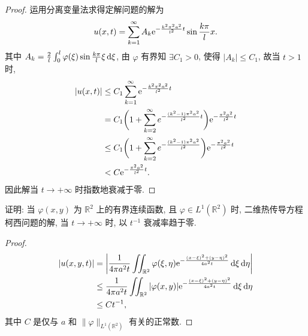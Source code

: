 \begin{proof}
  运用分离变量法求得定解问题的解为
  \[u(x,t) = \sum_{k=1}^{\infty} A_k \mathrm{e}^{-\frac{k^2\pi^2a^2}{l^2}t}\sin\frac{k\pi}{l}x.\]
  其中 $A_k=\frac{2}{l} \int_0^l \varphi(\xi) \sin\frac{k\pi}{l}\xi\mathop{}\!\mathrm{d}\xi$,
  由 $\varphi$ 有界知 $\exists C_1>0$, 使得 $|A_k|\leq C_1$, 故当 $t>1$ 时,
  \[\begin{split}
  |u(x,t)|
  & \leq C_1\sum_{k=1}^{\infty} \mathrm{e}^{-\frac{k^2\pi^2a^2}{l^2}t} \\
  & = C_1\biggl(1+\sum_{k=2}^{\infty}e^{-\frac{(k^2-1)\pi^2a^2}{l^2}t}\biggr)
      \mathrm{e}^{-\frac{\pi^2a^2}{l^2}t} \\
  & \leq C_1\biggl(1+\sum_{k=2}^{\infty}e^{-\frac{(k^2-1)\pi^2a^2}{l^2}}\biggr)
      \mathrm{e}^{-\frac{\pi^2a^2}{l^2}t} \\
  & < C\mathrm{e}^{-\frac{\pi^2a^2}{l^2}t}.
  \end{split}\]
  因此解当 $t\to+\infty$ 时指数地衰减于零.
\end{proof}


\begin{exercise}
  证明: 当 $\varphi(x,y)$ 为 $\mathbb{R}^2$ 上的有界连续函数, 且 $\varphi\in L^1(\mathbb{R}^2)$
  时, 二维热传导方程柯西问题的解, 当 $t\to +\infty$ 时, 以 $t^{-1}$ 衰减率趋于零.
\end{exercise}

\begin{proof}
  \[\begin{split}
    |u(x,y,t)|
    & = \left|\frac{1}{4\pi a^2t} \iint_{\mathbb{R}^2} \varphi(\xi,\eta)
        \mathrm{e}^{-\frac{(x-\xi)^2+(y-\eta)^2}{4a^2t}}\mathop{}\!\mathrm{d}\xi\mathop{}\!\mathrm{d}\eta\right| \\
    & \leq \frac{1}{4\pi a^2t} \iint_{\mathbb{R}^2} |\varphi(x,y)|
        \mathrm{e}^{-\frac{(x-\xi)^2+(y-\eta)^2}{4a^2t}}\mathop{}\!\mathrm{d}\xi\mathop{}\!\mathrm{d}\eta \\
    & \leq Ct^{-1},
  \end{split}\]
  其中 $C$ 是仅与 $a$ 和 $\|\varphi\|_{L^1(\mathbb{R}^2)}$ 有关的正常数.
\end{proof}